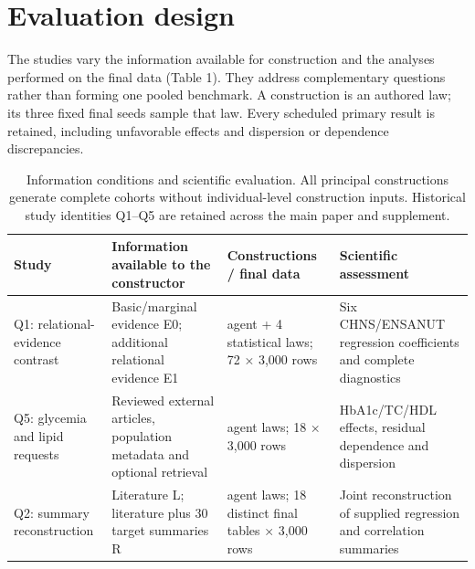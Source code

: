 \documentclass[10pt,twocolumn]{article}
\begin{document}
\section{Evaluation design}

The studies vary the information available for construction and the analyses performed on the final data (Table 1). They address complementary questions rather than forming one pooled benchmark. A construction is an authored law; its three fixed final seeds sample that law. Every scheduled primary result is retained, including unfavorable effects and dispersion or dependence discrepancies.


\begin{table}[t]

\caption{Information conditions and scientific evaluation. All principal constructions generate complete cohorts without individual-level construction inputs. Historical study identities Q1–Q5 are retained across the main paper and supplement.}

\label{tab:1}

\centering\fontsize{8}{9.5}\selectfont

\setlength{\tabcolsep}{4pt}

\renewcommand{\arraystretch}{1.12}

\begin{tabularx}{\textwidth}{@{}>{\raggedright\arraybackslash}X>{\raggedright\arraybackslash}X>{\raggedright\arraybackslash}X>{\raggedright\arraybackslash}X@{}}

\toprule

Study & Information available to the constructor & Constructions / final data & Scientific assessment \\

\midrule

Q1: relational-evidence contrast & Basic/marginal evidence E0; additional relational evidence E1 & 20 agent + 4 statistical laws; 72 × 3,000 rows & Six CHNS/ENSANUT regression coefficients and complete diagnostics \\

Q5: glycemia and lipid requests & Reviewed external articles, population metadata and optional retrieval & 6 agent laws; 18 × 3,000 rows & HbA1c/TC/HDL effects, residual dependence and dispersion \\

Q2: summary reconstruction & Literature L; literature plus 30 target summaries R & 6 agent laws; 18 distinct final tables × 3,000 rows & Joint reconstruction of supplied regression and correlation summaries \\


\end{tabularx}
\end{table}
\end{document}
